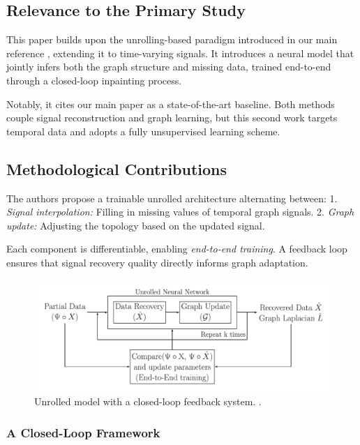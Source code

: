 \documentclass{article}
\theoremstyle{plain}
\theoremstyle{definition}
\theoremstyle{remark}
\begin{document}
\subsection{Relevance to the Primary Study}

This paper \cite{batreddy2025inpainting} builds upon the unrolling-based paradigm introduced in our main reference \cite{do2024interpretable}, extending it to time-varying signals. It introduces a neural model that jointly infers both the graph structure and missing data, trained end-to-end through a closed-loop inpainting process.

Notably, it cites our main paper as a state-of-the-art baseline. Both methods couple signal reconstruction and graph learning, but this second work targets temporal data and adopts a fully unsupervised learning scheme.

\subsection{Methodological Contributions}

The authors propose a trainable unrolled architecture alternating between:
1. \textit{Signal interpolation:} Filling in missing values of temporal graph signals.
2. \textit{Graph update:} Adjusting the topology based on the updated signal.


Each component is differentiable, enabling \textit{end-to-end training}. A feedback loop ensures that signal recovery quality directly informs graph adaptation.

\begin{figure}[h]
    \centering
    \vskip -0.1in
    \includegraphics[width=\linewidth]{paper2.png}
    \vskip -0.15in
    \caption{Unrolled model with a closed-loop feedback system. \cite{batreddy2025inpainting}.}
    \label{fig:paper2_model}
    \vskip -0.2in
\end{figure}

\subsubsection{A Closed-Loop Framework}
\end{document}
